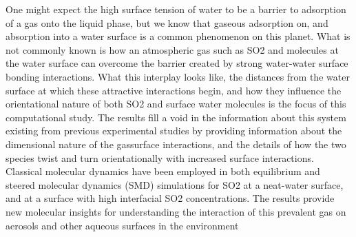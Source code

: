 One might expect the high surface tension of water to be a barrier to adsorption of a gas onto the liquid phase, but we know that gaseous adsorption on, and absorption into a water surface is a common phenomenon on this planet. What is not commonly known is how an atmospheric gas such as SO2 and molecules at the water surface can overcome the barrier created by strong water-water surface bonding interactions. What this interplay looks like, the distances from the water surface at which these attractive interactions begin, and how they influence the orientational nature of both SO2 and surface water molecules is the focus of this computational study. The results fill a void in the information about this system existing from previous experimental studies by providing information about the dimensional nature of the gassurface interactions, and the details of how the two species twist and turn orientationally with increased surface interactions. Classical molecular dynamics have been employed in both equilibrium and steered molecular dynamics (SMD) simulations for SO2 at a neat-water surface, and at a surface with high interfacial SO2 concentrations. The results provide new molecular insights for understanding the interaction of this prevalent gas on aerosols and other aqueous surfaces in the environment
